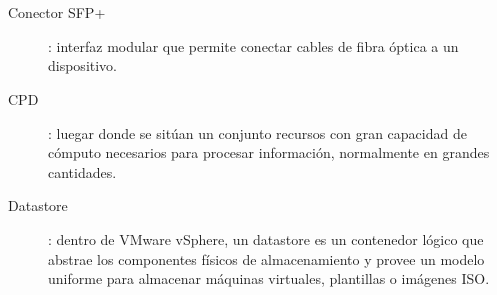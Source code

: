 \chapter*{\nomeglosariotermos}
\label{chap:glosario-termos}


\begin{description}
   \item [Conector SFP+]: interfaz modular que permite conectar cables de fibra óptica a un dispositivo.
   \label{itm:sfp} 
  \item [CPD]: luegar donde se sitúan un conjunto recursos con gran capacidad de cómputo necesarios para procesar información, normalmente en grandes cantidades.
  \label{itm:cpd}
  \item [Datastore]: dentro de VMware vSphere, un datastore es un contenedor lógico que abstrae los componentes físicos de almacenamiento y provee un modelo uniforme para almacenar máquinas virtuales, plantillas o imágenes ISO.

\end{description}
